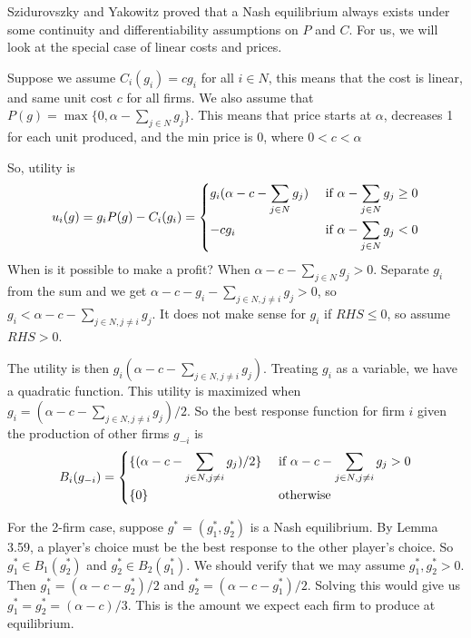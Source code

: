 \documentclass[twoside]{article}
\begin{document}
Szidurovszky and Yakowitz proved that a Nash equilibrium always exists under some continuity and differentiability assumptions on $P$ and $C$. For us, we will look at the special case of linear costs and prices. 

Suppose we assume $C_i(g_i) = cg_i$ for all $i \in N$, this means that the cost is linear, and same unit cost $c$ for all firms. We also assume that  $P(g) = \max\{0, \alpha - \sum_{j \in N}g_j\}$. This means that price starts at $\alpha$, decreases 1 for each unit produced, and the min price is 0, where $0 < c < \alpha$

So, utility is $$u_i(g) = g_iP(g) - C_i (g_i) = \begin{dcases}
g_i (\alpha - c - \sum_{j \in N} g_j) & \text{ if } \alpha - \sum_{j \in N}g_j \geq 0\\
-cg_i & \text{ if } \alpha - \sum_{j \in N}g_j < 0
\end{dcases}$$
When is it possible to make a profit? When $\alpha - c - \sum_{j \in N} g_j > 0$. Separate $g_i$ from the sum and we get $\alpha - c - g_i - \sum_{j \in N, j \neq i} g_j > 0$, so $g_i  < \alpha - c - \sum_{j \in N, j \neq i} g_j $. It does not make sense for $g_i$ if $RHS \leq 0$, so assume $RHS > 0$. 

The utility is then $g_i (\alpha - c - \sum_{j \in N, j \neq i} g_j )$. Treating $g_i$ as a variable, we have a quadratic function. This utility is maximized when $g_i = (\alpha - c - \sum_{j \in N, j \neq i}g_j) / 2$. So the best response function for firm $i$ given the production of other firms $g_{-i}$ is $$B_i(g_{-i}) = \begin{dcases}
\{(\alpha - c - \sum_{j \in N, j \neq i}g_j) / 2\} & \text{ if }\alpha - c - \sum_{j \in N, j \neq i} g_j > 0\\
\{0\} & \text{ otherwise}
\end{dcases}$$

For the 2-firm case, suppose $g^* = (g_1^*, g_2^*)$ is a Nash equilibrium. By Lemma 3.59, a player's choice must be the best response to the other player's choice. So $g_1^* \in B_1(g_2^*)$ and $g_2^* \in B_2(g_1^*)$. We should verify that we may assume $g_1^*, g_2^* > 0$. Then $g_1^* = (\alpha - c - g_2^*) / 2$ and $g_2^* = (\alpha - c - g_1^*) / 2$. Solving this would give us $g_1^* =g_2^* = (\alpha - c) / 3$. This is the amount we expect each firm to produce at equilibrium. 
\end{document}
